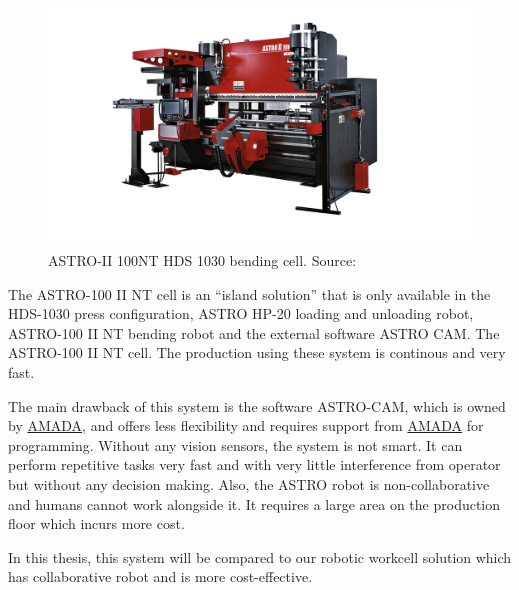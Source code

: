 \begin{figure}[h]
    \centering
    \includegraphics[width=\textwidth]{figures/ASTRO-100.jpg}
    \caption{ASTRO-II 100NT HDS 1030 bending cell. Source: \cite{astro100}}
    \label{fig:astro}
\end{figure}

The ASTRO-100 II NT cell is an “island solution” that is only available in the HDS-1030 press configuration, ASTRO HP-20 loading and unloading robot, ASTRO-100 II NT bending robot and the external software ASTRO CAM.
The ASTRO-100 II NT cell. \cite{astro100} The production using these system is continous and very fast.


The main drawback of this system is the software ASTRO-CAM, which is owned by \hyperref[acro:AMADA]{AMADA}, and offers less flexibility and requires support from \hyperref[acro:AMADA]{AMADA} for programming. Without any vision sensors, the system is not smart. It can perform repetitive tasks very fast and with very little interference from operator but without any decision making. Also, the ASTRO robot is non-collaborative and humans cannot work alongside it.
It requires a large area on the production floor which incurs more cost.

In this thesis, this system will be compared to our robotic workcell solution which has collaborative robot and is more cost-effective.
